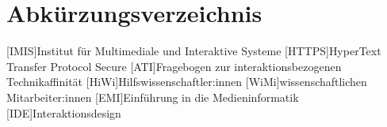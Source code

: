 
\cleardoublepage
{}
{}
\chapter*{Abkürzungsverzeichnis}
\label{section-abbrevs}


\begin{acronym}[CoLab]
  [IMIS]{Institut für Multimediale und Interaktive Systeme}
  [HTTPS]{HyperText Transfer Protocol Secure}
  [ATI]{Fragebogen zur interaktionsbezogenen Technikaffinität}
  [HiWi]{Hilfswissenschaftler:innen}
  [WiMi]{wissenschaftlichen Mitarbeiter:innen}
  [EMI]{Einführung in die Medieninformatik}
  [IDE]{Interaktionsdesign}
\end{acronym}
